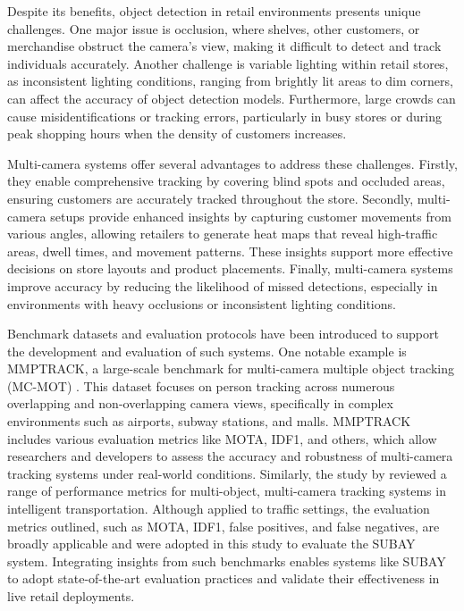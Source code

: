 {Despite its benefits, object detection in retail environments presents unique challenges. One major issue is occlusion, where shelves, other customers, or merchandise obstruct the camera’s view, making it difficult to detect and track individuals accurately. Another challenge is variable lighting within retail stores, as inconsistent lighting conditions, ranging from brightly lit areas to dim corners, can affect the accuracy of object detection models. Furthermore, large crowds can cause misidentifications or tracking errors, particularly in busy stores or during peak shopping hours when the density of customers increases.

Multi-camera systems offer several advantages to address these challenges. Firstly, they enable comprehensive tracking by covering blind spots and occluded areas, ensuring customers are accurately tracked throughout the store. Secondly, multi-camera setups provide enhanced insights by capturing customer movements from various angles, allowing retailers to generate heat maps that reveal high-traffic areas, dwell times, and movement patterns. These insights support more effective decisions on store layouts and product placements. Finally, multi-camera systems improve accuracy by reducing the likelihood of missed detections, especially in environments with heavy occlusions or inconsistent lighting conditions.

Benchmark datasets and evaluation protocols have been introduced to support the development and evaluation of such systems. One notable example is MMPTRACK, a large-scale benchmark for multi-camera multiple object tracking (MC-MOT) \citep{Han2023}. This dataset focuses on person tracking across numerous overlapping and non-overlapping camera views, specifically in complex environments such as airports, subway stations, and malls. MMPTRACK includes various evaluation metrics like MOTA, IDF1, and others, which allow researchers and developers to assess the accuracy and robustness of multi-camera tracking systems under real-world conditions. Similarly, the study by \cite{Fei2023} reviewed a range of performance metrics for multi-object, multi-camera tracking systems in intelligent transportation. Although applied to traffic settings, the evaluation metrics outlined, such as MOTA, IDF1, false positives, and false negatives, are broadly applicable and were adopted in this study to evaluate the SUBAY system. Integrating insights from such benchmarks enables systems like SUBAY to adopt state-of-the-art evaluation practices and validate their effectiveness in live retail deployments.

}
